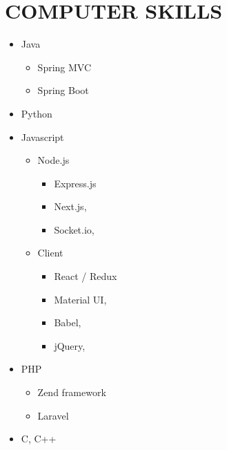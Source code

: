 \documentclass[10pt,a4paper,sans]{moderncv} %
\begin{document}
		

	\section{COMPUTER SKILLS}
	
	\begin{cvcolumns}
		{
			\begin{itemize}
				\item Java
				\begin{itemize}
					\item Spring MVC
					\item Spring Boot
				\end{itemize}
				\item Python
				\item Javascript
				\begin{itemize}
					\item Node.js
					\begin{itemize}
						\item Express.js
						\item Next.js,
						\item Socket.io,
					\end{itemize}
					\item Client
					\begin{itemize}
						\item React / Redux
						\item Material UI,
						\item Babel,
						\item jQuery,
					\end{itemize}
				\end{itemize}
				\item PHP
				\begin{itemize}
					\item Zend framework
					\item Laravel
				\end{itemize}
				\item C, C++
			\end{itemize}
		}
		

\end{cvcolumns}
\end{document}
